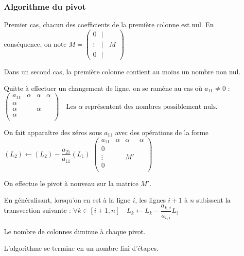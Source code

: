 {\subsubsection{Algorithme du pivot}
Premier cas, chacun des coefficients de la première colonne est nul. En conséquence, on note 
$M = \begin{pmatrix} 0 & | &  \\ \vdots & | & M \\ 0 & | &  \end{pmatrix}$ 

Dans un second cas, la première colonne contient au moins un nombre non nul.

 Quitte à effectuer un changement de ligne, on se ramène au cas où $a_{11}\neq 0$ :
 $
 \left(
 \begin{array}{c|ccc}
 a_{11} & \alpha & \alpha & \alpha \\
\hline
\alpha  & & & \\
\alpha  & & \alpha & \\
\alpha  & & & \\
\end{array}
 \right) \quad 
 \text{Les } \alpha \text{ représentent des nombres possiblement nuls.}
 $ 

 On fait apparaître des zéros sous $a_{11}$ avec des opérations de la forme $(L_2)\leftarrow (L_2)-\dfrac{a_{21}}{a_{11}}(L_1)$ 
 $
 \left(
 \begin{array}{c|ccc}
 a_{11} & \alpha & \alpha & \alpha \\
\hline
0  & & & \\
\vdots  & & M'& \\
0  & & & \\
\end{array}
 \right) 
 $ 
 
 On effectue le pivot  à nouveau sur la matrice $M'$.
 
 En généralisant, lorsqu'on en est à la ligne $i$, les lignes $i+1$ à $n$ subissent la transvection suivante : 
 $
 \forall k \in[i+1,n] \quad L_{k}\leftarrow L_k - \dfrac{a_{k,i}}{a_{i,i}}L_i
 $
 
 \begin{remarques}
 Le nombre de colonnes diminue à chaque pivot.
 
 L'algorithme se termine en un nombre fini d'étapes.
 \end{remarques}


}
